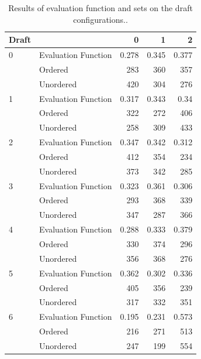 \documentclass[letterpaper]{article}
\numberwithin{equation}{section}
\numberwithin{theorem}{section}
\numberwithin{lemma}{section}
\numberwithin{df}{section}
\begin{document}
\begin{table}[]
\begin{tabular}{l l r r r}  %
\hline                       %
Draft &  & 0 & 1 & 2 \\[0.5ex]%
\hline                    %
0&Evaluation Function&0.278&0.345&0.377\\
&Ordered&283&360&357\\
&Unordered&420&304&276\\
1&Evaluation Function&0.317&0.343&0.34\\
&Ordered&322&272&406\\
&Unordered&258&309&433\\
2&Evaluation Function&0.347&0.342&0.312\\
&Ordered&412&354&234\\
&Unordered&373&342&285\\
3&Evaluation Function&0.323&0.361&0.306\\
&Ordered&293&368&339\\
&Unordered&347&287&366\\
4&Evaluation Function&0.288&0.333&0.379\\
&Ordered&330&374&296\\
&Unordered&356&368&276\\
5&Evaluation Function&0.362&0.302&0.336\\
&Ordered&405&356&239\\
&Unordered&317&332&351\\
6&Evaluation Function&0.195&0.231&0.573\\
&Ordered&216&271&513\\
&Unordered&247&199&554\\
[1ex]
\hline     %
\end{tabular} 
\caption{\label{tab:results} Results of evaluation function and sets on the draft configurations..}
\end{table}
\end{document}
